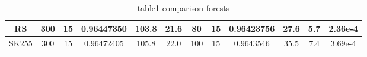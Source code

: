 \begin{table}[]
\begin{tabular}{@{}cccccccccccc@{}}
\multicolumn{1}{|c|}{RS}           & \multicolumn{1}{c|}{300}            & \multicolumn{1}{c|}{15}             & \multicolumn{1}{c|}{0.96447350}     & \multicolumn{1}{c|}{103.8}       & \multicolumn{1}{c|}{21.6}            & \multicolumn{1}{c|}{80}             & \multicolumn{1}{c|}{15}             & \multicolumn{1}{c|}{0.96423756}     & \multicolumn{1}{c|}{27.6}        & \multicolumn{1}{c|}{5.7}             & \multicolumn{1}{c|}{2.36e-4}         \\ \midrule
\multicolumn{1}{|c|}{SK255}        & \multicolumn{1}{c|}{300}            & \multicolumn{1}{c|}{15}             & \multicolumn{1}{c|}{0.96472405}     & \multicolumn{1}{c|}{105.8}       & \multicolumn{1}{c|}{22.0}            & \multicolumn{1}{c|}{100}            & \multicolumn{1}{c|}{15}             & \multicolumn{1}{c|}{0.9643546}      & \multicolumn{1}{c|}{35.5}        & \multicolumn{1}{c|}{7.4}             & \multicolumn{1}{c|}{3.69e-4}         \\ \bottomrule
\end{tabular}
\caption{table1 comparison forests}
\label{tab:RF1}
\end{table}


